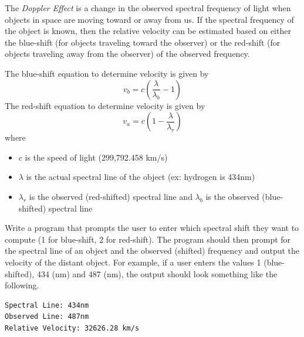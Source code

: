 \begin{exer}
The \emph{Doppler Effect} is a change in the observed 
spectral frequency of light when objects in space are moving toward or away
from us.  If the spectral frequency of the object is known, then the
relative velocity can be estimated based on either the blue-shift (for
objects traveling toward the observer) or the red-shift (for objects
traveling away from the observer) of the observed frequency.  

The blue-shift equation to determine velocity is given by 
$$v_b = c\left(\frac{\lambda}{\lambda_b} - 1\right)$$
The red-shift equation to determine velocity is given by
$$v_a = c\left(1 - \frac{\lambda}{\lambda_r}\right)$$
where
\begin{itemize}
  \item $c$ is the speed of light (299,792.458 km/s)
  \item $\lambda$ is the actual spectral line of the object (ex: 
  	hydrogen is 434nm)
  \item $\lambda_r$ is the observed (red-shifted) spectral line and
  	$\lambda_b$ is the observed (blue-shifted) spectral line
\end{itemize}

Write a program that prompts the user to enter which spectral shift they
want to compute (1 for blue-shift, 2 for red-shift).  The program should then
prompt for the spectral line of an object and the observed
(shifted) frequency and output the velocity of the distant object.
For example, if a user enters the values 1 (blue-shifted), 434 (nm) 
and 487 (nm), the output
should look something like the following.

\begin{verbatim}
Spectral Line: 434nm
Observed Line: 487nm
Relative Velocity: 32626.28 km/s
\end{verbatim}
\end{exer}

